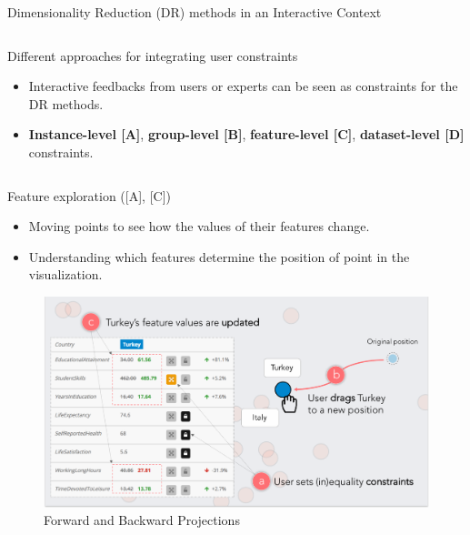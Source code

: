 \documentclass{beamer}
\begin{document}
\begin{frame}[fragile]
\begin{block}{Dimensionality Reduction (DR) methods in an Interactive Context}
\begin{columns}[T]
  \end{columns}
\end{block}

\begin{block}{Different approaches for integrating user constraints}
  \begin{itemize}
      \item Interactive feedbacks from users or experts can be seen as constraints for the DR methods.
      \item \textbf{Instance-level [A]},
        \textbf{group-level [B]},
        \textbf{feature-level [C]},
        \textbf{dataset-level [D]} constraints.
  \end{itemize}

  \begin{columns}[T]
  \begin{column}{.3\textwidth}

      \begin{block}{Feature exploration ([A], [C])}
        \begin{itemize}
        \item Moving points to see how the values of their features change.
        \item Understanding which features determine the position of point in the visualization.
        \end{itemize}
        \begin{figure}[h!]
          \includegraphics[width=\linewidth]{eg_forward_backward}
          \caption{Forward and Backward Projections \cite{cavallo2017FWBW}}
        \end{figure}
      \end{block}


\end{column}
\end{columns}
\end{block}
\end{frame}
\end{document}
